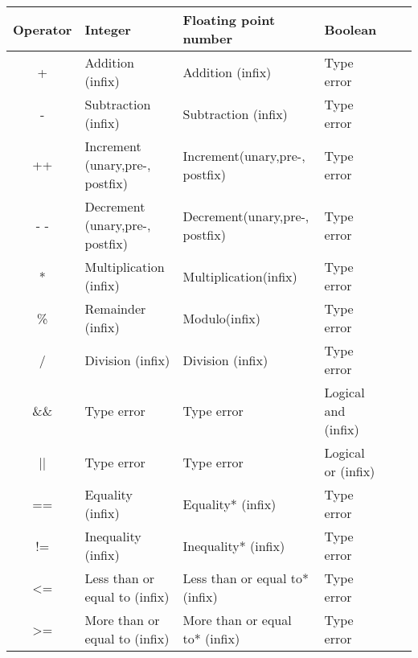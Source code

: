 \begin{table}[h]
    \centering
    \begin{tabular}{|c|l|l|l|l|l|}
    \hline
    \textbf{Operator}  & \textbf{Integer}                   & \textbf{Floating point number}    & \textbf{Boolean}       \\ \hline
    +                  & Addition (infix)                   & Addition (infix)                  & Type error             \\ \hline 
    -                  & Subtraction (infix)                & Subtraction (infix)               & Type error             \\ \hline 
    ++                 & Increment (unary,pre-, postfix)    & Increment(unary,pre-, postfix)    & Type error             \\ \hline    
    - -                  & Decrement (unary,pre-, postfix)    & Decrement(unary,pre-, postfix)    & Type error             \\ \hline
    *                  & Multiplication (infix)             & Multiplication(infix)             & Type error             \\ \hline
    \%                 & Remainder (infix)                  & Modulo(infix)                     & Type error             \\ \hline
    /                  & Division (infix)                   & Division (infix)                  & Type error             \\ \hline
    \&\&               & Type error                         & Type error                        & Logical and (infix)    \\ \hline 
    ||                 & Type error                         & Type error                        & Logical or (infix)     \\ \hline 
    ==                 & Equality (infix)                   & Equality* (infix)                 & Type error             \\ \hline 
    !=                 & Inequality (infix)                 & Inequality* (infix)               & Type error             \\ \hline
    <=                 & Less than or equal to (infix)      & Less than or equal to* (infix)    & Type error             \\ \hline
    >=                 & More than or equal to (infix)      & More than or equal to* (infix)    & Type error             \\ \hline

\end{tabular}
\end{table}
